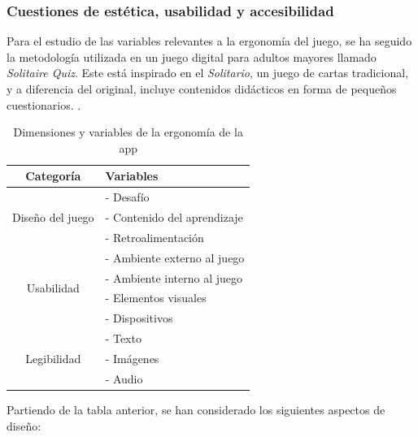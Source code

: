 \newpage

\subsubsection{Cuestiones de estética, usabilidad y accesibilidad}

Para el estudio de las variables relevantes a la ergonomía del juego, se ha seguido la metodología utilizada en un juego digital para adultos mayores llamado \textit{Solitaire Quiz}. Este está inspirado en el \textit{Solitario}, un juego de cartas tradicional, y a diferencia del original, incluye contenidos didácticos en forma de pequeños cuestionarios. \parencite{diseño2017}.

\begin{table}[H]
	\centering
	\begin{tabular}{|c|p{6cm}|}
		\hline
		\rowcolor{lightgray}
		\textbf{Categoría} & \textbf{Variables}\\
		\hline
		\multirow{3}{*}{Diseño del juego} & - Desafío \\
		& - Contenido del aprendizaje \\
		& - Retroalimentación \\
		\hline
		\multirow{4}{*}{Usabilidad} & - Ambiente externo al juego \\
		& - Ambiente interno al juego \\
		& - Elementos visuales \\
		& - Dispositivos \\
		\hline
		\multirow{3}{*}{Legibilidad} & - Texto \\
		& - Imágenes \\
		& - Audio \\
		\hline
	\end{tabular}
	\caption{Dimensiones y variables de la ergonomía de la app}
	\label{tab:usabilidad}
\end{table}

Partiendo de la tabla anterior, se han considerado los siguientes aspectos de diseño:


